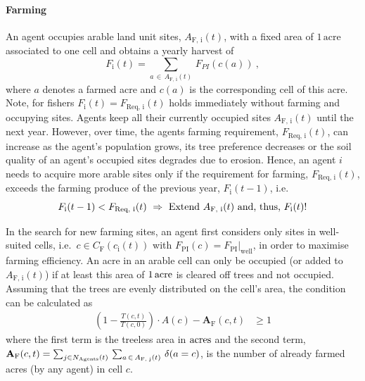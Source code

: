 \paragraph{Farming}
An agent occupies arable land unit sites, $A_\text{F, i}(t)$, with a fixed area of $1\, \text{acre}$ associated to one cell and obtains a yearly harvest of
\begin{equation}\label{AProd}
F_\text{i}(t) = \sum_{a \, \in \, A_\text{F, i}(t)} \, F_{PI}(c(a))\ ,
\end{equation}
where $a$ denotes a farmed acre and $c(a)$ is the corresponding cell of this acre.
Note, for fishers $F_\text{i}(t) = F_\text{Req, i}(t)$ holds immediately without farming and occupying sites.
Agents keep all their currently occupied sites $A_\text{F, i}(t)$ until the next year.%
However, over time, the agents farming requirement, $F_\text{Req, i}(t)$, can increase as the agent's population grows, its tree preference decreases or the soil quality of an agent's occupied sites degrades due to erosion.
Hence, an agent $i$ needs to acquire more arable sites only if the requirement for farming, $F_\text{Req, i}(t)$, exceeds the farming produce of the previous year, $F_\text{i}(t-1)$, i.e.\
\begin{equation}
F_\text{i}(t-1) < F_\text{Req, i}(t) \ \Rightarrow \ \text{Extend } A_\text{F, i}(t) \text{ and, thus, } F_\text{i}(t) {\rm !}
\end{equation}

In the search for new farming sites, an agent first considers only sites in well-suited cells, i.e.\ $c \in C_\text{F}(c_\text{i}(t))$ with $F_\text{PI}(c)=F_\text{PI}|_\text{well}$, in order to maximise farming efficiency.
An acre in an arable cell can only be occupied (or added to $A_\text{F, i}(t)$) if at least this area of $1\, {\rm acre}$ is cleared off trees and not occupied. 
Assuming that the trees are evenly distributed on the cell's area, the condition can be calculated as 
\begin{eqnarray}
\left( 1 - \frac{T(c,t)}{T(c,0)} \right) \cdot A(c) - \mathbf{A}_\text{F}(c, t) & \geq   1
\label{eq:BurningCond}
\end{eqnarray}
where the first term is the treeless area in ${\rm acres}$ and the second term, $\mathbf{A}_\text{F}(c, t) = \sum_{j \in N_{\rm Agents}(t)} \, \sum_{a \, \in \, A_\text{F, j}(t)} \, \delta(a=c)$, is the number of already farmed acres (by any agent) in cell $c$.

